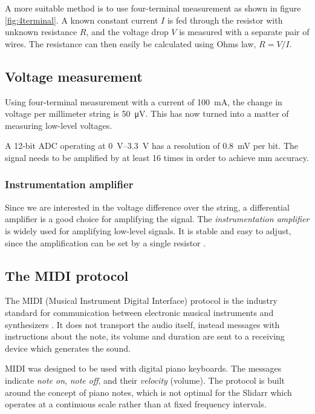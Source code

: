 \documentclass{article}
\begin{document}
A more suitable method is to use four-terminal measurement as shown in figure \ref{fig:4terminal}. A known constant current $I$ is fed through the resistor with unknown resistance $R$, and the voltage drop $V$ is measured with a separate pair of wires. The resistance can then easily be calculated using Ohms law, $ R = V / I $.

\subsection{Voltage measurement} \label{sec:voltage_measurement}
Using four-terminal measurement with a current of \SI{100}{\milli\ampere}, the change in voltage per millimeter string is \SI{50}{\micro\volt}. This has now turned into a matter of measuring low-level voltages.

A 12-bit ADC operating at \SIrange{0}{3.3}{\volt} has a resolution of \SI{0.8}{\milli\volt} per bit. The signal needs to be amplified by at least 16 times in order to achieve \si{\milli\meter} accuracy.

\subsubsection{Instrumentation amplifier}
Since we are interested in the voltage difference over the string, a differential amplifier is a good choice for amplifying the signal. The \textit{instrumentation amplifier} is widely used for amplifying low-level signals. It is stable and easy to adjust, since the amplification can be set by a single resistor \cite{in}.

\subsection{The MIDI protocol} \label{sec:midi_protocol}
The MIDI (Musical Instrument Digital Interface) protocol is the industry standard for communication between electronic musical instruments and synthesizers \cite{midiorg}. It does not transport the audio itself, instead messages with instructions about the note, its volume and duration are sent to a receiving device which generates the sound. 

MIDI was designed to be used with digital piano keyboards. The messages indicate \textit{note on}, \textit{note off}, and their \textit{velocity} (volume). The protocol is built around the concept of piano notes, which is not optimal for the Slidarr which operates at a continuous scale rather than at fixed frequency intervals.
\end{document}
